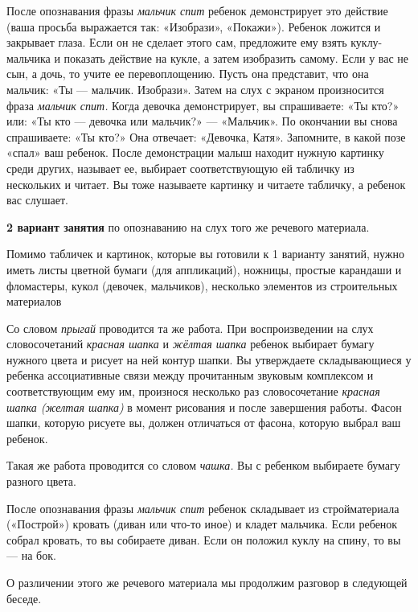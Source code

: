 \documentclass[a5paper]{book}
\renewcommand{\emph}[1]{\textit{#1}}
\begin{document}
После опознавания фразы \emph{мальчик спит} ребенок демонстрирует это
действие (ваша просьба выражается так: «Изобрази», «Покажи»). Ребенок
ложится и закрывает глаза. Если он не сделает этого сам, предложите ему
взять куклу-мальчика и показать действие на кукле, а затем изобразить
самому. Если у вас не сын, а дочь, то учите ее перевоплощению. Пусть она
представит, что она мальчик: «Ты --- мальчик. Изобрази». Затем на слух с
экраном произносится фраза \emph{мальчик спит.} Когда девочка
демонстрирует, вы спрашиваете: «Ты кто?» или: «Ты кто --- девочка или
мальчик?» --- «Мальчик». По окончании вы снова спрашиваете: «Ты кто?»
Она отвечает: «Девочка, Катя». Запомните, в какой позе «спал» ваш
ребенок. После демонстрации малыш находит нужную картинку среди других,
называет ее, выбирает соответствующую ей табличку из нескольких и
читает. Вы тоже называете картинку и читаете табличку, а ребенок вас
слушает.

\textbf{2 вариант занятия} по опознаванию на слух того же речевого
материала.

Помимо табличек и картинок, которые вы готовили к 1 варианту занятий,
нужно иметь листы цветной бумаги (для аппликаций), ножницы, простые
карандаши и фломастеры, кукол (девочек, мальчиков), несколько элементов
из строительных материалов

Со словом \emph{прыгай} проводится та же работа. При воспроизведении на
слух словосочетаний \emph{красная шапка} и \emph{жёлтая шапка} ребенок
выбирает бумагу нужного цвета и рисует на ней контур шапки. Вы
утверждаете складывающиеся у ребенка ассоциативные связи между
прочитанным звуковым комплексом и соответствующим ему им, произнося
несколько раз словосочетание \emph{красная шапка (желтая шапка)} в
момент рисования и после завершения работы. Фасон шапки, которую рисуете
вы, должен отличаться от фасона, которую выбрал ваш ребенок.

Такая же работа проводится со словом \emph{чашка.} Вы с ребенком
выбираете бумагу разного цвета.

После опознавания фразы \emph{мальчик спит} ребенок складывает из
стройматериала («Построй») кровать (диван или что-то иное) и кладет
мальчика. Если ребенок собрал кровать, то вы собираете диван. Если он
положил куклу на спину, то вы --- на бок.

О различении этого же речевого материала мы продолжим разговор в
следующей беседе.
\end{document}
